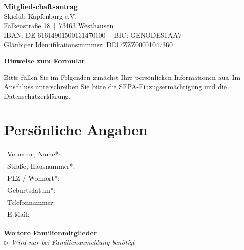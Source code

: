 \documentclass[a4paper,12pt]{article}
\begin{document}
\begin{center}
    {\LARGE \textbf{Mitgliedschaftsantrag}}\\[0.8em]
    {\large Skiclub Kapfenburg e.V.}\\[0.3em]
    {\small Falkenstraße 18 \,|\, 73463 Westhausen}\\
    {\footnotesize IBAN: DE 61614901500131470000 \,|\, BIC: GENODES1AAV}\\
    {\footnotesize Gläubiger Identifikationsnummer: DE17ZZZ00001047360}
\end{center}

\vspace{1em}

\begin{tcolorbox}
\textbf{Hinweise zum Formular}

\vspace{0.3em}

Bitte füllen Sie im Folgenden zunächst Ihre persönlichen Informationen aus.  
Im Anschluss unterschreiben Sie bitte die SEPA-Einzugsermächtigung und die Datenschutzerklärung.
\end{tcolorbox}

\vspace{1.2em}

\section*{Persönliche Angaben}

\renewcommand{\arraystretch}{1.8}

\begin{tabularx}{\textwidth}{p{6cm} X}
Vorname, Name*: & \hrulefill \\
Straße, Hausnummer*: & \hrulefill \\
PLZ / Wohnort*: & \hrulefill \\
Geburtsdatum*: & \hrulefill \\
Telefonnummer: & \hrulefill \\
E-Mail: & \hrulefill \\
\end{tabularx}

\vspace{1.5em}

\textbf{Weitere Familienmitglieder}\\
\textit{\scriptsize{$\triangleright$ Wird nur bei Familienanmeldung benötigt}}\\
\renewcommand{\arraystretch}{1.6}
\end{document}
